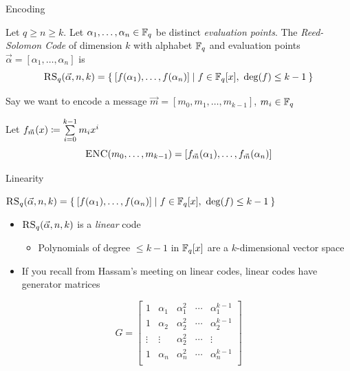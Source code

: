 \documentclass[aspectratio=169]{beamer}
\begin{document}
\begin{frame}{Encoding}
    \begin{defn}
        Let $q \geq n \geq k$.
        Let $\alpha_1, \ldots, \alpha_n \in \mathbb{F}_q$ be distinct \emph{evaluation points}.
        The \emph{Reed-Solomon Code} of dimension $k$ with alphabet $\mathbb{F}_q$ and evaluation points $\vec{\alpha} = [\alpha_1, \ldots, \alpha_n]$ is
        \[
            \textsc{RS}_q(\vec{\alpha}, n, k) = \Set{ \bqty{f(\alpha_1), \ldots, f(\alpha_n)} | f \in \F_q[x],~ \deg(f) \leq k - 1}
        \]
    \end{defn}\pause
    Say we want to encode a message $\vec{m} = [m_0, m_1, \ldots, m_{k - 1}]$, $m_i \in \mathbb{F}_q$ \pause
    
    Let $f_{\vec{m}}(x) \coloneqq  \sum\limits_{i = 0}^{k - 1} m_i x^i$ \pause
    \[
        \textsc{ENC}(m_0, \ldots, m_{k - 1}) = \bqty{f_{\vec{m}}(\alpha_1), \ldots, f_{\vec{m}}(\alpha_n)}
    \]
\end{frame}

\begin{frame}{Linearity}
    \begin{defn}
        $\textsc{RS}_q(\vec{\alpha}, n, k) = \Set{ \bqty{f(\alpha_1), \ldots, f(\alpha_n)} | f \in \F_q[x],~ \deg(f) \leq k - 1}$
    \end{defn}\pause
    \begin{itemize}
        \item $\textsc{RS}_q(\vec{\alpha}, n, k)$ is a \emph{linear} code
        \begin{itemize}
            \item Polynomials of degree $\leq k - 1$ in $\mathbb{F}_q[x]$ are a $k$-dimensional vector space
        \end{itemize}\pause
        \item If you recall from Hassam's meeting on linear codes, linear codes have generator matrices
    \end{itemize}
    \[
    G = \begin{bmatrix}
        1 & \alpha_1 & \alpha_1^2 & \cdots & \alpha_1^{k - 1} \\
        1 & \alpha_2 & \alpha_2^2 & \cdots & \alpha_2^{k - 1} \\
        \vdots & \vdots & \alpha_2^2 & \cdots & \vdots \\
        1 & \alpha_n & \alpha_n^2 & \cdots & \alpha_n^{k - 1} \\
    \end{bmatrix}
    \]
\end{frame}
\end{document}
